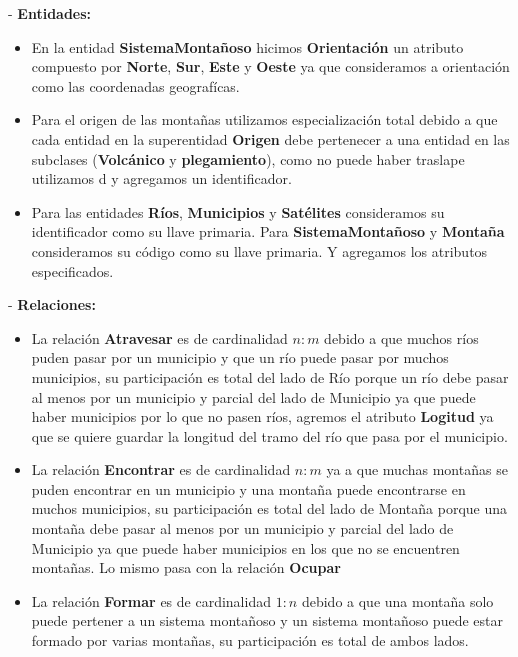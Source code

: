 \documentclass[letterpaper,11pt]{article}
\begin{document}
\begin{itemize}
- \textbf{Entidades:} 
\begin{itemize}
\item En la entidad \textbf{SistemaMontañoso} hicimos \textbf{Orientación} 
      un atributo compuesto por \textbf{Norte}, \textbf{Sur}, \textbf{Este}
      y \textbf{Oeste} ya que consideramos a orientación como las coordenadas
      geografícas.
\item Para el origen de las montañas utilizamos especialización total debido
      a que cada entidad en la superentidad \textbf{Origen} debe pertenecer a 
      una entidad en las subclases (\textbf{Volcánico} y \textbf{plegamiento}), 
      como no puede haber traslape utilizamos d y agregamos un identificador.      
\item Para las entidades \textbf{Ríos}, \textbf{Municipios} y \textbf{Satélites}
      consideramos su identificador como su llave primaria. Para \textbf{SistemaMontañoso}
      y \textbf{Montaña} consideramos su código como su llave primaria. Y agregamos 
      los atributos especificados.
\end{itemize}

- \textbf{Relaciones: } 
\begin{itemize}
\item La relación \textbf{Atravesar} es de cardinalidad $n:m$ debido 
      a que muchos ríos puden pasar por un municipio y que un río puede 
      pasar por muchos municipios, su participación es total del lado de 
      Río porque un río debe pasar al menos por un municipio y parcial del 
      lado de Municipio ya que puede haber municipios por lo que no pasen ríos, 
      agremos el atributo \textbf{Logitud} ya que se quiere guardar la longitud
      del tramo del río que pasa por el municipio.
\item La relación \textbf{Encontrar} es de cardinalidad $n:m$ ya
      a que muchas montañas se puden encontrar en un municipio y una montaña puede 
      encontrarse en muchos municipios, su participación es total del lado de 
     Montaña porque una montaña debe pasar al menos por un municipio y parcial del 
     lado de Municipio ya que puede haber municipios en los que no se encuentren 
     montañas. Lo mismo pasa con la relación \textbf{Ocupar}

\item La relación \textbf{Formar} es de cardinalidad $1:n$ debido a que una montaña 
      solo puede pertener a un sistema montañoso y un sistema montañoso puede estar
      formado por varias montañas, su participación es total de ambos lados. 


\end{itemize}
\end{itemize}
\end{document}
